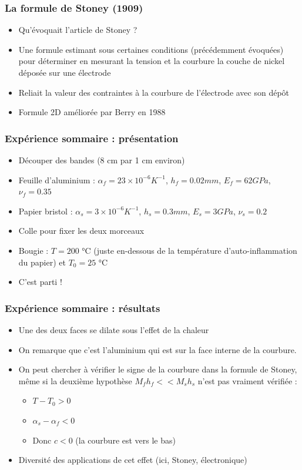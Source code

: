 \documentclass{beamer}
\begin{document}

\begin{frame}
    \frametitle{La formule de Stoney (1909)}

    \begin{itemize}
        \item Qu'évoquait l'article de Stoney ?
        \item Une formule estimant sous certaines conditions (précédemment évoquées) pour déterminer en mesurant la tension et la courbure la couche de nickel déposée sur une électrode 
        \item Reliait la valeur des contraintes à la courbure de l'électrode avec son dépôt
        \item Formule 2D améliorée par Berry en 1988
    \end{itemize}
    
\end{frame}


\begin{frame}
\frametitle{Expérience sommaire : présentation}
\begin{itemize}
    \item Découper des bandes (8 cm par 1 cm environ)
    \item Feuille d'aluminium : $\alpha_f = 23 \times 10^{-6} K^{-1}$, $h_f = 0.02 mm$, $E_f = 62 GPa$, $\nu_f = 0.35$
    \item Papier bristol : $\alpha_s = 3 \times 10^{-6} K^{-1}$, $h_s = 0.3 mm$, $E_s = 3 GPa$, $\nu_s = 0.2$
    \item Colle pour fixer les deux morceaux
    \item Bougie : $T = 200$ °C (juste en-dessous de la température d'auto-inflammation du papier) et $T_0 = 25$ °C
    \item C'est parti !
\end{itemize}
\end{frame}


\begin{frame}
\frametitle{Expérience sommaire : résultats}
    \begin{itemize}
        \item Une des deux faces se dilate sous l'effet de la chaleur
        \item On remarque que c'est l'aluminium qui est sur la face interne de la courbure. 
        \item On peut chercher à vérifier le signe de la courbure dans la formule de Stoney, même si la deuxième hypothèse $M_f h_f << M_s h_s$ n'est pas vraiment vérifiée :
        \begin{itemize}    
            \item $T-T_0 > 0$
            \item $\alpha_s - \alpha_f < 0$
            \item Donc $c < 0$ (la courbure est vers le bas)
        \end{itemize}
        \item Diversité des applications de cet effet (ici, Stoney, électronique)
    \end{itemize}
\end{frame}
\end{document}
